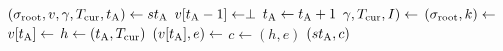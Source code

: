 \algrenewcommand\textproc{}
\algrenewcommand{}

\begin{minipage}{1\linewidth}
  {\fontsize{8}{10}\selectfont

  \begin{algorithmic}[1]
    \State $(\sigma_\text{root},v,\gamma,T_\text{cur},t_\text{A}) \gets st_\text{A}$
    \State $v[t_\text{A}-1] \gets \perp$
    \State $t_\text{A} \gets t_\text{A}+1$
    \State $\gamma,T_\text{cur},I) \gets$ 
    \State $(\sigma_\text{root},k) \gets$ 
    \State $v[t_\text{A}] \gets$ 
    \EndIf
    \State $h \gets (t_\text{A},T_\text{cur})$
    \State $(v[t_\text{A}],e) \gets$ 
    \State $c \gets (h,e)$
    \State \Return $(st_\text{A},c)$
    \EndProcedure
  \end{algorithmic}
  }
\end{minipage}